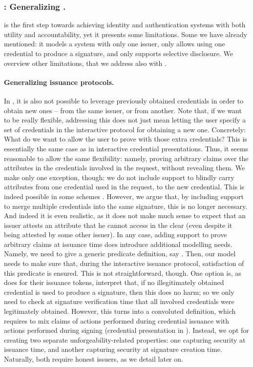\subsubsection{\UAS: Generalizing \GSAC.} %
\GSAC is the first step towards achieving identity and authentication systems
with both utility and accountability, yet it presents some limitations. Some we
have already mentioned: it models a system with only one issuer, only allows
using one credential to produce a signature, and only supports selective
disclosure. We overview other limitations, that we address also with \UAS.

\paragraph{Generalizing issuance protocols.} %
In \GSAC, it is also not possible to leverage previously obtained credentials in
order to obtain new ones -- from the same issuer, or from another. Note that, if
we want to be really flexible, addressing this does not just mean letting the
user specify a set of credentials in the interactive protocol for obtaining a
new one. Concretely: What do we want to allow the user to prove with those extra
credentials? This is essentially the same case as in interactive credential
presentations. Thus, it seems reasonable to allow the same flexibility: namely,
proving arbitrary claims over the attributes in the credentials involved in the
request, without revealing them. We make only one exception, though: we do not
include support to blindly carry attributes from one credential used in the
request, to the new credential. This is indeed possible in some schemes
\cite{bcl04}. However, we argue that, by including support to merge multiple
credentials into the same signature, this is no longer necessary. And indeed
it is even realistic, as it does not make much sense to expect that an issuer
attests an attribute that he cannot access in the clear (even despite it being
attested by some other issuer). In any case, adding support to prove arbitrary
claims at issuance time does introduce additional modelling needs. Namely, we
need to give a generic predicate definition, say \fissue. Then, our model needs
to make sure that, during the interactive issuance protocol, satisfaction of
this predicate is ensured. This is not straightforward, though. One option is,
as \cite{ckl+15} does for their issuance tokens, interpret that, if no
illegitimately obtained credential is used to produce a signature, then this
does no harm; so we only need to check at signature verification time that all
involved credentials were legitimately obtained. However, this turns into a
convoluted definition, which requires to mix claims of actions performed during
credential issuance with actions performed during signing (credential
presentation in \cite{ckl+15}). Instead, we opt for creating two separate
unforgeability-related properties: one capturing security at issuance time, and
another capturing security at signature creation time. Naturally, both require
honest issuers, as we detail later on.

